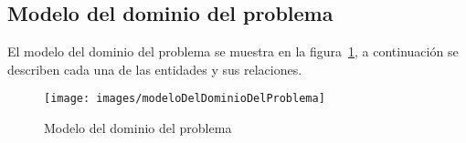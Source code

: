 \subsection{Modelo del dominio del problema}

	El modelo del dominio del problema se muestra en la figura~\ref{fig:modeloDeDominio}, a continuación se describen cada una de las entidades y sus relaciones.
	
\begin{figure}[htbp!]
	\begin{center}
		\texttt{[image: images/modeloDelDominioDelProblema]}
		\caption{Modelo del dominio del problema}
		\label{fig:modeloDeDominio}
	\end{center}
\end{figure}


\newenvironment{cdtEntidad}[2]{%
	\def \varBusinessEntityId{#2}%
	\hypertarget{#1}{\hspace{1pt}}%
	\newline%
	\noindent{\texttt{[image: images/uc/classRule]}}%
	\vspace{-25pt}%
	\subsection{Entidad: #2}%
	\noindent\begin{longtable}{|p{.2\textwidth}| p{.15\textwidth} | p{.46\textwidth} |p{.08\textwidth} |}%
	\hline%
	\multicolumn{4}{|c|}{{\cellcolor{colorSecundario}\color{white}Atributos}}\\ \hline%
	{\cellcolor{colorAgua}Nombre} &%
	{\cellcolor{colorAgua}Tipo} &%
	{\cellcolor{colorAgua}Descripción} &%
	{\cellcolor{colorAgua}Requerido}%
	\\ \hline%
	\endhead%
}{%
	\end{longtable}%
}

\newcommand{\brAttr}[5]{%
	{\bf\hypertarget{\varBusinessEntityId:#1}{#2}} & {\em{#3}} & {#4} & #5 \\\hline
}

\newcommand{\cdtEntityRelSection}{%
	\multicolumn{4}{|c|}{{\cellcolor{colorSecundario}\color{white}Relaciones}}\\ \hline%
	{\cellcolor{colorAgua}Tipo de relación} &%
	{\cellcolor{colorAgua}Entidad} &%
	\multicolumn{2}{|c|}{{\cellcolor{colorAgua}Rol}}
	\\ \hline%
}

